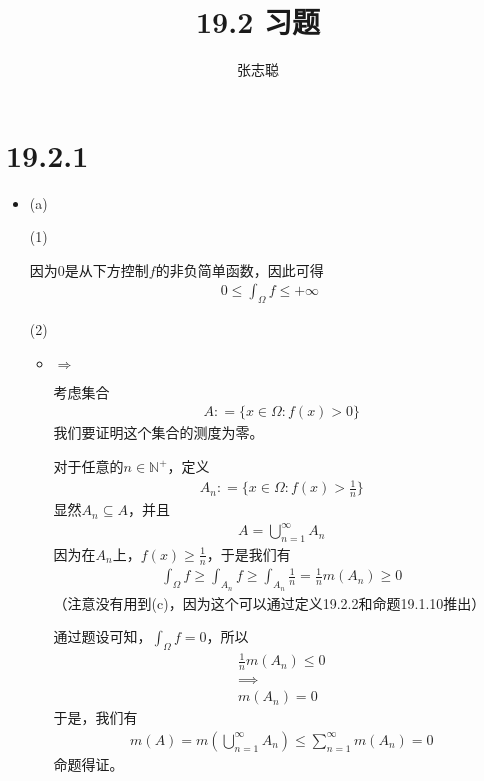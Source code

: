 \documentclass{article}
\begin{document}
\title{19.2 习题}
\author{张志聪}
\maketitle

\section*{19.2.1}

\begin{itemize}
  \item (a)

        (1)

        因为$0$是从下方控制$f$的非负简单函数，因此可得
        \begin{align*}
          0 \leq \int_{\Omega} f \leq +\infty
        \end{align*}

        (2)
        \begin{itemize}
          \item $\Rightarrow$

                考虑集合
                \begin{align*}
                  A : = \{x \in \Omega : f(x) > 0\}
                \end{align*}
                我们要证明这个集合的测度为零。

                对于任意的$n \in \mathbb{N}^+$，定义
                \begin{align*}
                  A_n : = \{x \in \Omega : f(x) > \frac{1}{n}\}
                \end{align*}
                显然$A_n \subseteq A$，并且
                \begin{align*}
                  A = \bigcup_{n = 1}^{\infty} A_n
                \end{align*}
                因为在$A_n$上，$f(x) \geq \frac{1}{n}$，于是我们有
                \begin{align*}
                  \int_{\Omega} f \geq \int_{A_n} f \geq \int_{A_n} \frac{1}{n} = \frac{1}{n} m(A_n) \geq 0
                \end{align*}
                （注意没有用到(c)，因为这个可以通过定义19.2.2和命题19.1.10推出）

                通过题设可知，$\int_{\Omega} f = 0$，所以
                \begin{align*}
                  \frac{1}{n} m(A_n) \leq 0 \\
                  \implies                  \\
                  m(A_n) = 0
                \end{align*}
                于是，我们有
                \begin{align*}
                  m(A) = m(\bigcup_{n = 1}^{\infty} A_n) \leq \sum_{n = 1}^{\infty} m(A_n) = 0
                \end{align*}
                命题得证。


\end{itemize}
\end{itemize}
\end{document}
